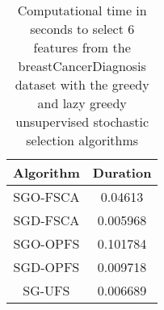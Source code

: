 \begin{table}
	\begin{center}
		\begin{tabular}{c c}
			Algorithm & Duration \\
			\hline
			SGO-FSCA & 0.04613 \\
			SGD-FSCA & 0.005968 \\
			SGO-OPFS & 0.101784 \\
			SGD-OPFS & 0.009718 \\
			SG-UFS & 0.006689 \\
		\end{tabular}
	\end{center}
	\caption{Computational time in seconds to select 6 features from the breastCancerDiagnosis dataset with the greedy and lazy greedy unsupervised stochastic selection algorithms}
\end{table}